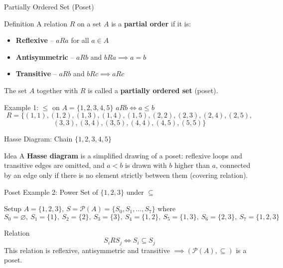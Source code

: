 \documentclass[aspectratio=169]{beamer}
\begin{document}
\begin{frame}{Partially Ordered Set (Poset)}
\begin{block}{Definition}
A relation $R$ on a set $A$ is a \textbf{partial order} if it is:
\begin{itemize}
\item \textbf{Reflexive} -- $aRa$ for all $a\in A$
\item \textbf{Antisymmetric} -- $aRb$ and $bRa \implies a=b$
\item \textbf{Transitive} -- $aRb$ and $bRc \implies aRc$
\end{itemize}
The set $A$ together with $R$ is called a \textbf{partially ordered set} (poset).
\end{block}
\begin{exampleblock}{Example 1: $\le$ on $A=\{1,2,3,4,5\}$}
$aRb \iff a\le b$
$$R=\{(1,1),(1,2),(1,3),(1,4),(1,5),(2,2),(2,3),(2,4),(2,5),$$
$$(3,3),(3,4),(3,5),(4,4),(4,5),(5,5)\}$$
\end{exampleblock}
\end{frame}

\begin{frame}{Hasse Diagram: Chain $\{1,2,3,4,5\}$}
\begin{block}{Idea}
A \textbf{Hasse diagram} is a simplified drawing of a poset: reflexive loops and transitive edges are omitted, and $a<b$ is drawn with $b$ higher than $a$, connected by an edge only if there is no element strictly between them (covering relation).
\end{block}
\centering
{}
\end{frame}

\begin{frame}{Poset Example 2: Power Set of $\{1,2,3\}$ under $\subseteq$}
\begin{exampleblock}{Setup}
$A=\{1,2,3\}$, \quad $S=\mathcal{P}(A)=\{S_0,S_1,\dots,S_7\}$ where
$$S_0=\varnothing,\ S_1=\{1\},\ S_2=\{2\},\ S_3=\{3\},\ S_4=\{1,2\},\ S_5=\{1,3\},\ S_6=\{2,3\},\ S_7=\{1,2,3\}$$
\end{exampleblock}
\begin{block}{Relation}
$$S_iRS_j \iff S_i\subseteq S_j$$
This relation is reflexive, antisymmetric and transitive $\implies (\mathcal{P}(A),\subseteq)$ is a poset.
\end{block}
\end{frame}
\end{document}
